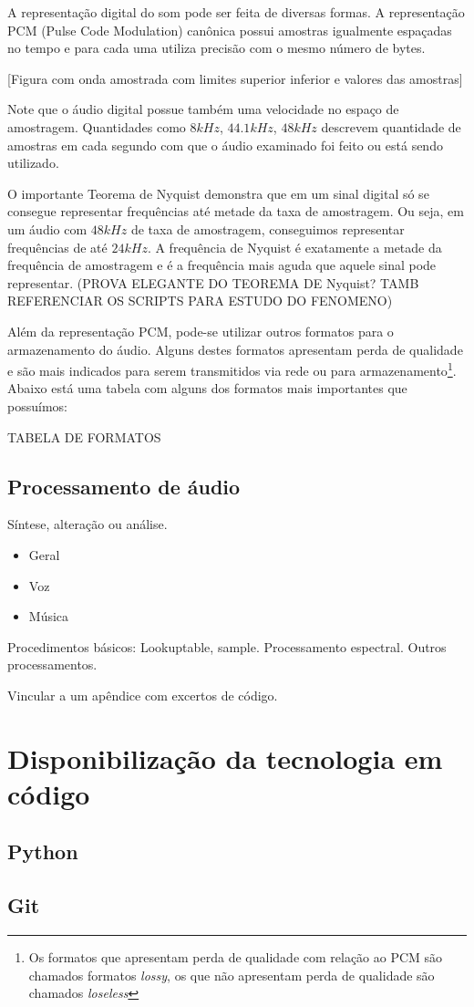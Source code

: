 A representação digital do som pode ser feita de diversas formas.
A representação PCM (Pulse Code Modulation) canônica possui amostras
igualmente espaçadas no tempo e para cada uma utiliza precisão com o mesmo
número de bytes.

[Figura com onda amostrada com limites superior inferior e valores das amostras]

Note que o áudio digital possue também uma velocidade no espaço de amostragem.
Quantidades como $8kHz$, $44.1kHz$, $48kHz$
descrevem quantidade de amostras em cada segundo com que o áudio examinado foi feito ou
está sendo utilizado.

O importante Teorema de Nyquist demonstra que em um sinal digital só se consegue representar
frequências até metade da taxa de amostragem. Ou seja, em um áudio com $48kHz$ de taxa de amostragem,
conseguimos representar frequências de até $24kHz$. A frequência de Nyquist é exatamente a metade
da frequência de amostragem e é a frequência mais aguda que aquele sinal pode representar.
(PROVA ELEGANTE DO TEOREMA DE Nyquist? TAMB REFERENCIAR OS SCRIPTS PARA ESTUDO DO FENOMENO)

Além da representação PCM, pode-se utilizar outros formatos para o armazenamento do áudio. Alguns
destes formatos apresentam perda de qualidade e são mais indicados para serem transmitidos via rede ou
para armazenamento\footnote{Os formatos que apresentam perda de qualidade com relação
ao PCM são chamados formatos \emph{lossy}, os que não apresentam perda de qualidade
são chamados \emph{loseless}}. Abaixo está uma tabela com alguns dos formatos mais importantes que possuímos:

TABELA DE FORMATOS


\subsection{Processamento de áudio}

Síntese, alteração ou análise.

\begin{itemize}
    \item Geral
    \item Voz
    \item Música
\end{itemize}

Procedimentos básicos: Lookuptable, sample. Processamento
espectral. Outros processamentos.

Vincular a um apêndice com excertos de código.

\section{Disponibilização da tecnologia em código}

  \subsection{Python}


  \subsection{Git}

